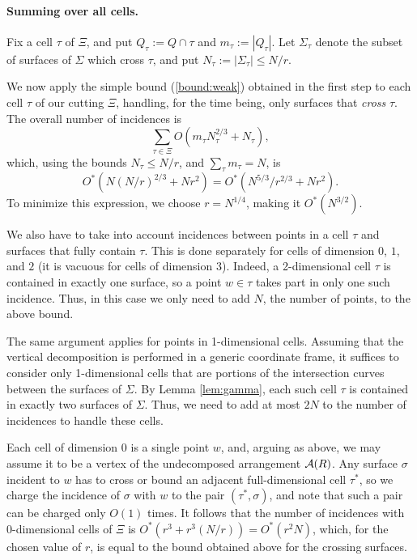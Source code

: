 \documentclass[12pt]{article}
\def\A{{\cal A}}
\begin{document}
\paragraph{Summing over all cells.}
Fix a cell $\tau$ of $\Xi$, and put $Q_\tau := Q \cap \tau$ and $m_\tau
:= |Q_\tau|$. Let $\Sigma_\tau$ denote the subset of surfaces of $\Sigma$
which cross $\tau$, and put $N_\tau := |\Sigma_\tau| \le N/r$.

We now apply the simple bound (\ref{bound:weak}) obtained in the
first step to each cell $\tau$ of our cutting $\Xi$, handling,
for the time being, only surfaces that {\em cross} $\tau$. The
overall number of incidences is
$$
\sum_{\tau\in\Xi} O\left(
m_\tau N_\tau^{2/3} + N_\tau
\right) ,
$$
which, using the bounds $N_\tau \le N/r$, and $\sum_\tau m_\tau = N$, is
$$
O^*\left( N(N/r)^{2/3} + Nr^2 \right) =
O^*\left( N^{5/3}/r^{2/3} + Nr^2 \right) .
$$
To minimize this expression, we choose $r=N^{1/4}$, making it
$O^*(N^{3/2})$.

We also have to take into account incidences between points in a
cell $\tau$ and surfaces that fully contain $\tau$. 
This is done separately for cells of dimension $0$, $1$, and $2$ (it
is vacuous for cells of dimension $3$). Indeed, a 2-dimensional cell
$\tau$ is contained in exactly one surface, so a point $w \in \tau$
takes part in only one such incidence.
Thus, in this case we only need to add $N$, the number of points,
to the above bound.

The same argument applies for points in 1-dimensional cells.
Assuming that the vertical decomposition is performed in a generic
coordinate frame, it suffices to consider only 1-dimensional cells that
are portions of the intersection curves between the surfaces of
$\Sigma$. By Lemma \ref{lem:gamma}, each such cell $\tau$ is contained
in exactly two surfaces of $\Sigma$.
Thus, we need to add at most $2N$ to the number of incidences to handle
these cells.

Each cell of dimension $0$ is a single point $w$, and, arguing as above,
we may assume it
to be a vertex of the undecomposed arrangement $\A(R)$. Any surface
$\sigma$ incident to $w$ has to cross or bound an adjacent
full-dimensional cell $\tau^*$, so we charge the incidence of $\sigma$
with $w$ to the pair $(\tau^*,\sigma)$, and note that such a pair can
be charged only $O(1)$ times. It follows that the number of incidences
with 0-dimensional cells of $\Xi$ is $O^*(r^3+r^3(N/r)) = O^*(r^2N)$,
which, for the chosen value of $r$, is equal to the bound obtained
above for the crossing surfaces.
\end{document}
